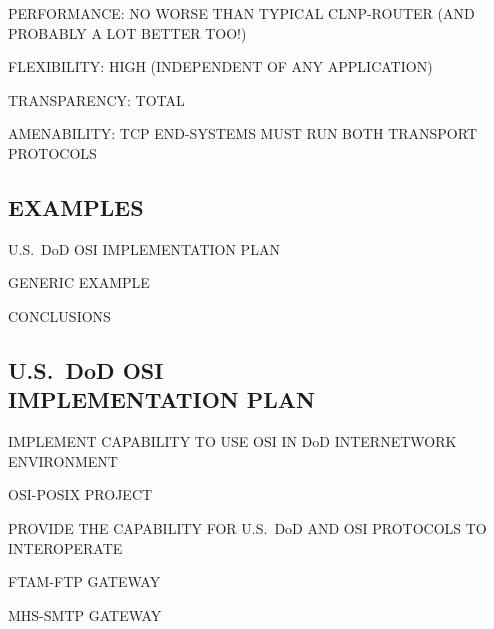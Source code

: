 \begin{bwslide}

\begin{nrtc}
\item	PERFORMANCE: NO WORSE THAN TYPICAL CLNP-ROUTER (AND PROBABLY A LOT
	BETTER TOO!)

\item	FLEXIBILITY: HIGH (INDEPENDENT OF ANY APPLICATION)

\item	TRANSPARENCY: TOTAL

\item	AMENABILITY: TCP END-SYSTEMS MUST RUN BOTH TRANSPORT PROTOCOLS
\end{nrtc}
\end{bwslide}


\begin{bwslide}
\part	{EXAMPLES}\bf

\begin{nrtc}
\item	U.S.~DoD OSI IMPLEMENTATION PLAN

\item	GENERIC EXAMPLE

\item	CONCLUSIONS
\end{nrtc}
\end{bwslide}


\begin{bwslide}
\part*	{U.S.~DoD OSI\\ IMPLEMENTATION PLAN}\bf

\begin{nrtc}
\item	IMPLEMENT CAPABILITY TO USE OSI IN DoD INTERNETWORK ENVIRONMENT
    \begin{nrtc}
    \item	OSI-POSIX PROJECT
    \end{nrtc}

\item	PROVIDE THE CAPABILITY FOR U.S.~DoD AND OSI PROTOCOLS TO INTEROPERATE
    \begin{nrtc}
    \item	FTAM-FTP GATEWAY

    \item	MHS-SMTP GATEWAY
    \end{nrtc}
\end{nrtc}
\end{bwslide}


